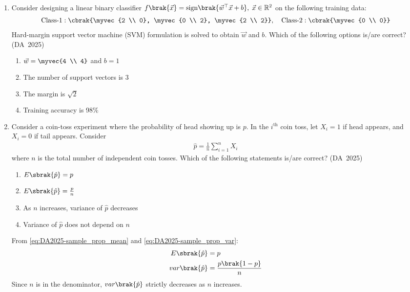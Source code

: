 \begin{enumerate}[label=\thesubsection.\arabic*, ref=\thesubsection.\theenumi]
	\item 
	Consider designing a linear binary classifier $f\brak{\vec{x}} = \text{sign}\brak{\vec{w}^{\top}\vec{x} + b}, \; \vec{x} \in \mathbb{R}^2$ on the following training data:
	\begin{align}
		\text{Class-1}: \cbrak{\myvec{2 \\ 0}, \myvec{0 \\ 2}, \myvec{2 \\ 2}}, \quad \text{Class-2}: \cbrak{\myvec{0 \\ 0}}
	\end{align}
	Hard-margin support vector machine (SVM) formulation is solved to obtain $\vec{w}$ and $b$. Which of the following options is/are correct?
	\hfill (DA~2025)
	\begin{enumerate}
		\item $\vec{w} = \myvec{4 \\ 4}$ and $b = 1$
		\item The number of support vectors is 3
		\item The margin is $\sqrt{2}$
		\item Training accuracy is 98\%
	\end{enumerate}
	
	\item 
	Consider a coin-toss experiment where the probability of head showing up is $p$. In the $i^{\text{th}}$ coin toss, let $X_i = 1$ if head appears, and $X_i = 0$ if tail appears. Consider
	\begin{align}
		\hat{p} = \frac{1}{n}\sum_{i=1}^n X_i
	\end{align}
	where $n$ is the total number of independent coin tosses. Which of the following statements is/are correct?
	\hfill (DA~2025)
	\begin{enumerate}
		\item $E\sbrak{\hat{p}} = p$
		\item $E\sbrak{\hat{p}} = \frac{p}{n}$
		\item As $n$ increases, variance of $\hat{p}$ decreases
		\item Variance of $\hat{p}$ does not depend on $n$
	\end{enumerate}
	\solution
	From \eqref{eq:DA2025-sample_prop_mean} and \eqref{eq:DA2025-sample_prop_var}:
	\begin{align}
		E\sbrak{\hat{p}} &= p
		\\
		var\brak{\hat{p}} &= \frac{p\brak{1-p}}{n}
	\end{align}
	Since $n$ is in the denominator, $var\brak{\hat{p}}$ strictly decreases as $n$ increases.
	

\end{enumerate}
